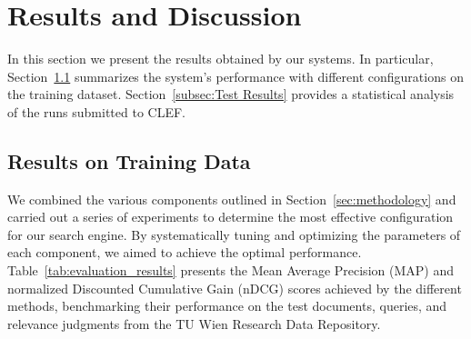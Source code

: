 \section{Results and Discussion}
\label{sec:results}

In this section we present the results obtained by our systems. In particular, Section~\ref{subsec:Results on Training Data} summarizes the system's performance with different configurations on the training dataset. Section~\ref{subsec:Test Results} provides a statistical analysis of the runs submitted to CLEF.

\subsection{Results on Training Data}
\label{subsec:Results on Training Data}
We combined the various components outlined in Section~\ref{sec:methodology} and carried out a series of experiments to determine the most effective configuration for our search engine. By systematically tuning and optimizing the parameters of each component, we aimed to achieve the optimal performance. Table~\ref{tab:evaluation_results} presents the Mean Average Precision (MAP) and normalized Discounted Cumulative Gain (nDCG) scores achieved by the different methods, benchmarking their performance on the test documents, queries, and relevance judgments from the TU Wien Research Data Repository\cite{longeval2025}.


